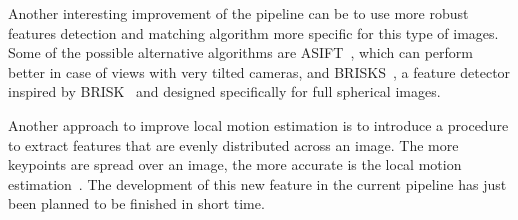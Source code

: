 Another interesting improvement of the pipeline can be to use more robust features detection and matching algorithm more specific for this type of images.
Some of the possible alternative algorithms are ASIFT~\cite{morel2009asift}, which
 can perform better in case of views with very tilted cameras, and
BRISKS~\cite{guan2017brisks}, a feature detector inspired by
BRISK~\cite{leutenegger2011brisk} and designed specifically for full spherical
images.

Another approach to improve local motion estimation is to
introduce a procedure to extract
features that are evenly distributed across an image. The more
keypoints are spread over an image, the more accurate is the local motion
estimation~\cite{irschara2009structure,schonberger2016structure}.
The development of this new feature in the current pipeline 
has just been planned to be finished in short time. 
